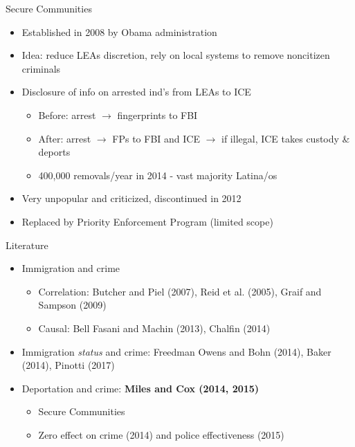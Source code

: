 \documentclass[xcolor=pdftex,dvipsnames,table]{beamer}
\begin{document}
\begin{frame}{Secure Communities}
\begin{itemize}
\item Established in 2008 by Obama administration
\item Idea: reduce LEAs discretion, rely on local systems to remove noncitizen criminals
\item Disclosure of info on arrested ind's from LEAs to ICE
\begin{itemize}
\item Before: arrest $\rightarrow$ fingerprints to FBI 
\item After: arrest $\rightarrow$ FPs to FBI and ICE $\rightarrow$ if illegal, ICE takes custody \& deports
\item  400,000 removals/year in 2014 - vast majority Latina/os
\end{itemize}
\item Very unpopular and criticized, discontinued in 2012
\item Replaced by Priority Enforcement Program (limited scope)
\end{itemize}
\end{frame}


\begin{frame}{Literature}
\begin{itemize}
\item Immigration and crime
\begin{itemize}
\item Correlation: Butcher and Piel (2007), Reid et al. (2005), Graif and Sampson (2009)
\item Causal: Bell Fasani and Machin (2013), Chalfin (2014)
\end{itemize}
\item Immigration \textit{status} and crime: Freedman Owens and Bohn (2014), Baker (2014), Pinotti (2017)
\item Deportation and crime: \textbf{Miles and Cox (2014, 2015)}
\begin{itemize}
\item Secure Communities 
\item Zero effect on crime (2014) and police effectiveness (2015)
\end{itemize}
\end{itemize}
\end{frame}


\end{document}

